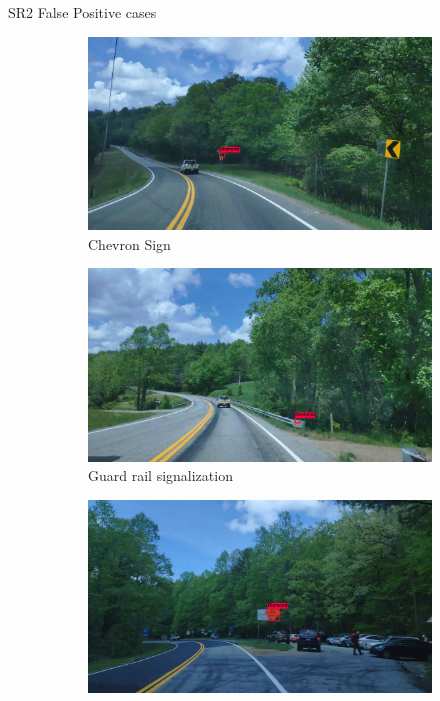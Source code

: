 \documentclass{beamer}
\begin{document}
\begin{frame}{SR2 False Positive cases}
    \begin{figure}
      \begin{center}
        \begin{subfigure}[t]{.49\linewidth}
          \centering
          \includegraphics[width=0.99\linewidth]{figures/examples/sr2/FP/FP_13.png}
          \caption{Chevron Sign}
          \label{fig:chevronFP}
        \end{subfigure}
        \begin{subfigure}[t]{.49\linewidth}
          \centering
          \includegraphics[width=0.99\linewidth]{figures/examples/sr2/FP/FP_09.png}
          \caption{Guard rail signalization}
          \label{fig:guardRailFP}
        \end{subfigure}
        \begin{subfigure}[t]{.49\linewidth}
          \centering
          \includegraphics[width=0.99\linewidth]{figures/examples/sr2/FP/FP_07.png}

\end{subfigure}
\end{center}
\end{figure}
\end{frame}
\end{document}
